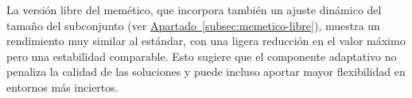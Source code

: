 La versión libre del memético, que incorpora también un ajuste dinámico del tamaño del subconjunto
(ver \hyperref[subsec:memetico-libre]{Apartado~\ref*{subsec:memetico-libre}}), muestra un rendimiento muy similar al estándar,
con una ligera reducción en el valor máximo pero una estabilidad comparable.
Esto sugiere que el componente adaptativo no penaliza la calidad de las soluciones y puede incluso aportar mayor flexibilidad en entornos más inciertos.


\begin{table}[htp]
    \centering
\end{table}

